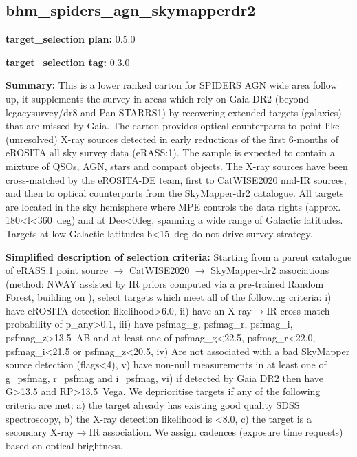 \hypertarget{bhm_spiders_agn_skymapperdr2_plan0.5.0}{%
\subsection{bhm\_spiders\_agn\_skymapperdr2}\label{bhm_spiders_agn_skymapperdr2_plan0.5.0}}

\noindent\textbf{target\_selection plan:} 0.5.0

\noindent\textbf{target\_selection tag:}
\href{https://github.com/sdss/target_selection/tree/0.3.0/}{0.3.0}

\noindent\textbf{Summary:} This is a lower ranked carton for SPIDERS AGN wide
area follow up, it supplements the survey in areas which rely on
Gaia-DR2 (beyond legacysurvey/dr8 and Pan-STARRS1) by recovering
extended targets (galaxies) that are missed by Gaia. The carton provides
optical counterparts to point-like (unresolved) X-ray sources detected
in early reductions of the first 6-months of eROSITA all sky survey data
(eRASS:1). The sample is expected to contain a mixture of QSOs, AGN,
stars and compact objects. The X-ray sources have been cross-matched by
the eROSITA-DE team, first to
CatWISE2020 \citep{Marocco2021}
mid-IR sources, and then to optical counterparts from the
SkyMapper-dr2 \citep{Onken2019}
catalogue. All targets are located in the sky hemisphere where MPE
controls the data rights (approx. 180\textless l\textless360~deg) and at
Dec\textless0deg, spanning a wide range of Galactic latitudes. Targets
at low Galactic latitudes \textbar b\textbar\textless15~deg do not drive
survey strategy.

\noindent\textbf{Simplified description of selection criteria:} Starting from a
parent catalogue of eRASS:1 point source $\rightarrow$ CatWISE2020 $\rightarrow$ SkyMapper-dr2
associations (method: NWAY assisted by IR priors computed via a
pre-trained Random Forest, building on
\citealt{Salvato2022}), select targets which meet all of the following criteria:
i) have eROSITA detection likelihood\textgreater6.0, ii) have an
X-ray$\rightarrow$IR cross-match probability of p\_any\textgreater0.1, iii) have
psfmag\_g, psfmag\_r, psfmag\_i, psfmag\_z\textgreater13.5~AB and at
least one of psfmag\_g\textless22.5, psfmag\_r\textless22.0,
psfmag\_i\textless21.5 or psfmag\_z\textless20.5, iv) Are not associated
with a bad SkyMapper source detection (flags\textless4), v) have
non-null measurements in at least one of g\_psfmag, r\_psfmag and
i\_psfmag, vi) if detected by Gaia DR2 then have G\textgreater13.5 and
RP\textgreater13.5~Vega. We deprioritise targets if any of the following
criteria are met: a) the target already has existing good quality SDSS
spectroscopy, b) the X-ray detection likelihood is \textless8.0, c) the
target is a secondary X-ray$\rightarrow$IR association. We assign cadences (exposure
time requests) based on optical brightness.


